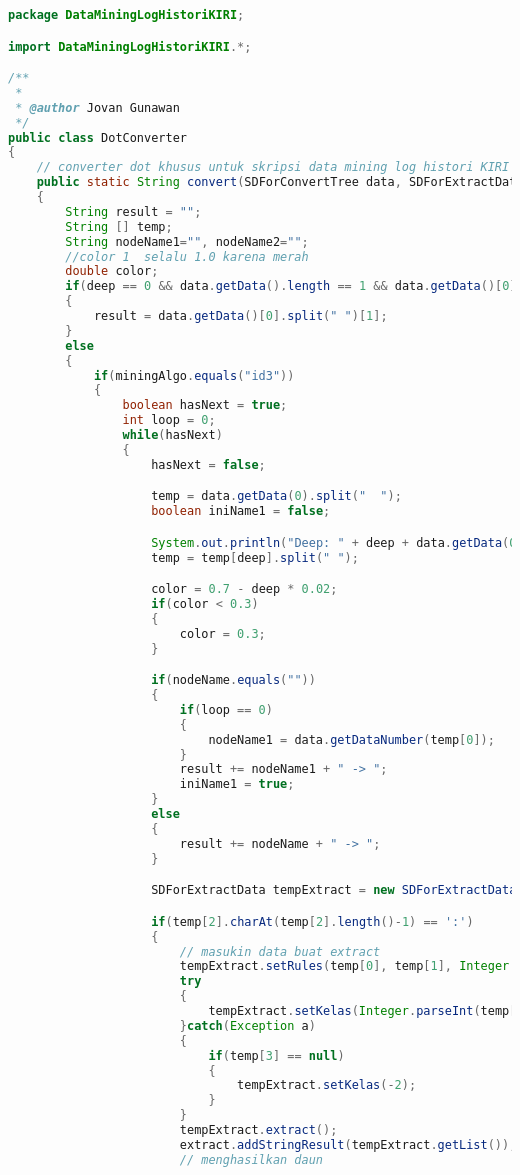 \begin{lstlisting}[language=Java,basicstyle=\tiny,caption=DotConverter.java]
package DataMiningLogHistoriKIRI;

import DataMiningLogHistoriKIRI.*;

/**
 *
 * @author Jovan Gunawan
 */
public class DotConverter 
{
    // converter dot khusus untuk skripsi data mining log histori KIRI --> output berupa tree dalam string dari weka
    public static String convert(SDForConvertTree data, SDForExtractData extract, String miningAlgo, int deep, String nodeName)
    {
        String result = "";
        String [] temp;
        String nodeName1="", nodeName2="";
        //color 1  selalu 1.0 karena merah
        double color; 
        if(deep == 0 && data.getData().length == 1 && data.getData()[0].charAt(0) == ':')
        {
            result = data.getData()[0].split(" ")[1];
        }
        else
        {
            if(miningAlgo.equals("id3"))
            {
                boolean hasNext = true;
                int loop = 0;
                while(hasNext)
                {
                    hasNext = false;

                    temp = data.getData(0).split("  ");
                    boolean iniName1 = false;

                    System.out.println("Deep: " + deep + data.getData(0));
                    temp = temp[deep].split(" ");

                    color = 0.7 - deep * 0.02;
                    if(color < 0.3)
                    {
                        color = 0.3;
                    }

                    if(nodeName.equals(""))
                    {
                        if(loop == 0)
                        {
                            nodeName1 = data.getDataNumber(temp[0]);
                        }
                        result += nodeName1 + " -> ";
                        iniName1 = true;
                    }
                    else
                    {
                        result += nodeName + " -> ";
                    }

                    SDForExtractData tempExtract = new SDForExtractData(extract);

                    if(temp[2].charAt(temp[2].length()-1) == ':')
                    {
                        // masukin data buat extract
                        tempExtract.setRules(temp[0], temp[1], Integer.parseInt(temp[2].substring(0, temp[2].length()-1)));
                        try
                        {
                            tempExtract.setKelas(Integer.parseInt(temp[3]));
                        }catch(Exception a)
                        {
                            if(temp[3] == null)
                            {
                                tempExtract.setKelas(-2);
                            }
                        }
                        tempExtract.extract();
                        extract.addStringResult(tempExtract.getList());
                        // menghasilkan daun


\end{lstlisting}
